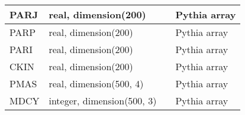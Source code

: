 \documentclass{article}
\begin{document}
\begin{longtable}{llll}
\midrule
PARJ & \begin{minipage}[t]{2cm}real, dimension(200)\end{minipage} & \begin{minipage}[t]{2cm}\end{minipage} & \begin{minipage}[t]{12cm}Pythia array\end{minipage}\\*
\midrule
PARP & \begin{minipage}[t]{2cm}real, dimension(200)\end{minipage} & \begin{minipage}[t]{2cm}\end{minipage} & \begin{minipage}[t]{12cm}Pythia array\end{minipage}\\*
\midrule
PARI & \begin{minipage}[t]{2cm}real, dimension(200)\end{minipage} & \begin{minipage}[t]{2cm}\end{minipage} & \begin{minipage}[t]{12cm}Pythia array\end{minipage}\\*
\midrule
CKIN & \begin{minipage}[t]{2cm}real, dimension(200)\end{minipage} & \begin{minipage}[t]{2cm}\end{minipage} & \begin{minipage}[t]{12cm}Pythia array\end{minipage}\\*
\midrule
PMAS & \begin{minipage}[t]{2cm}real, dimension(500, 4)\end{minipage} & \begin{minipage}[t]{2cm}\end{minipage} & \begin{minipage}[t]{12cm}Pythia array\end{minipage}\\*
\midrule
MDCY & \begin{minipage}[t]{2cm}integer, dimension(500, 3)\end{minipage} & \begin{minipage}[t]{2cm}\end{minipage} & \begin{minipage}[t]{12cm}Pythia array\end{minipage}\\*
\bottomrule
\end{longtable}
{ }
\end{document}
